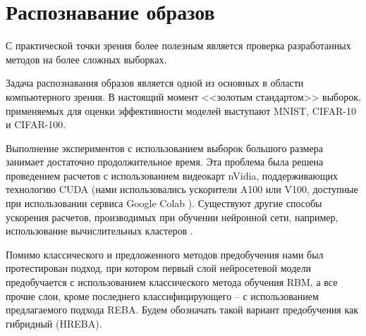 


\section{Распознавание образов}

С практической точки зрения более полезным является проверка разработанных методов на более сложных выборках.

Задача распознавания образов является одной из основных в области компьютерного зрения. В настоящий момент <<золотым стандартом>> выборок, применяемых для оценки эффективности моделей выступают MNIST, CIFAR-10 и CIFAR-100. %

Выполнение экспериментов с использованием выборок большого размера занимает достаточно продолжительное время. Эта проблема была решена проведением расчетов с использованием видеокарт nVidia, поддерживающих технологию CUDA (нами использовались ускорители A100 или V100, доступные при использовании сервиса Google Colab \cite{googlecolab}). Существуют другие способы ускорения расчетов, производимых при обучении нейронной сети, например, использование вычислительных кластеров \cite{n16}.

Помимо классического и предложенного методов предобучения нами был протестирован подход, при котором первый слой нейросетевой модели предобучается с использованием классического метода обучения RBM, а все прочие слои, кроме последнего классифицирующего -- с использованием предлагаемого подхода REBA. Будем обозначать такой вариант предобучения как гибридный (HREBA).


